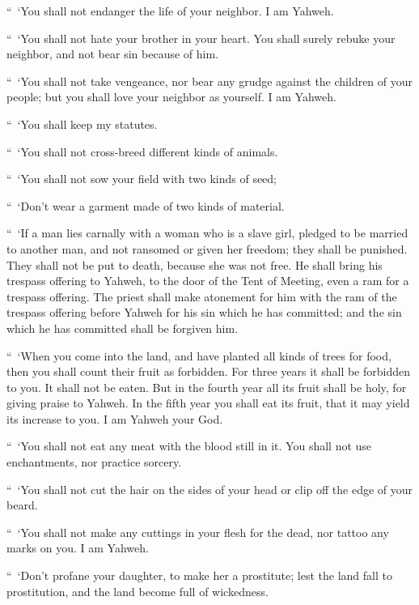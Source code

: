 {\par }{\PP “ ‘You shall not endanger the life of your neighbor. I am Yahweh.
\par }{\PP {}“ ‘You shall not hate your brother in your heart. You shall surely rebuke your neighbor, and not bear sin because of him.
\par }{\PP {}“ ‘You shall not take vengeance, nor bear any grudge against the children of your people; but you shall love your neighbor as yourself. I am Yahweh.
\par }{\PP {}“ ‘You shall keep my statutes.
\par }{\PP “ ‘You shall not cross-breed different kinds of animals.
\par }{\PP “ ‘You shall not sow your field with two kinds of seed;
\par }{\PP “ ‘Don’t wear a garment made of two kinds of material.
\par }{\PP {}“ ‘If a man lies carnally with a woman who is a slave girl, pledged to be married to another man, and not ransomed or given her freedom; they shall be punished. They shall not be put to death, because she was not free.
He shall bring his trespass offering to Yahweh, to the door of the Tent of Meeting, even a ram for a trespass offering.
The priest shall make atonement for him with the ram of the trespass offering before Yahweh for his sin which he has committed; and the sin which he has committed shall be forgiven him.
\par }{\PP {}“ ‘When you come into the land, and have planted all kinds of trees for food, then you shall count their fruit as forbidden. For three years it shall be forbidden to you. It shall not be eaten.
But in the fourth year all its fruit shall be holy, for giving praise to Yahweh.
In the fifth year you shall eat its fruit, that it may yield its increase to you. I am Yahweh your God.
\par }{\PP {}“ ‘You shall not eat any meat with the blood still in it. You shall not use enchantments, nor practice sorcery.
\par }{\PP {}“ ‘You shall not cut the hair on the sides of your head or clip off the edge of your beard.
\par }{\PP {}“ ‘You shall not make any cuttings in your flesh for the dead, nor tattoo any marks on you. I am Yahweh.
\par }{\PP {}“ ‘Don’t profane your daughter, to make her a prostitute; lest the land fall to prostitution, and the land become full of wickedness.
}
